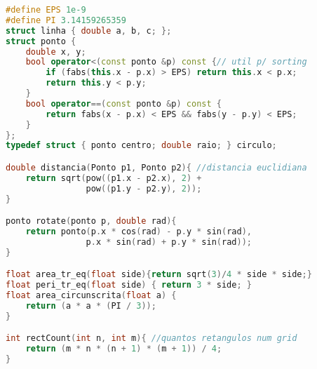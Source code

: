 \begin{lstlisting}[language=C++]
#define EPS 1e-9
#define PI 3.14159265359
struct linha { double a, b, c; };
struct ponto {
	double x, y;
    bool operator<(const ponto &p) const {// util p/ sorting
    	if (fabs(this.x - p.x) > EPS) return this.x < p.x;
        return this.y < p.y;
    }
    bool operator==(const ponto &p) const {
    	return fabs(x - p.x) < EPS && fabs(y - p.y) < EPS;
    }
};
typedef struct { ponto centro; double raio; } circulo;

double distancia(Ponto p1, Ponto p2){ //distancia euclidiana
	return sqrt(pow((p1.x - p2.x), 2) + 
    			pow((p1.y - p2.y), 2));
}

ponto rotate(ponto p, double rad){
	return ponto(p.x * cos(rad) - p.y * sin(rad),
    			p.x * sin(rad) + p.y * sin(rad));
}

float area_tr_eq(float side){return sqrt(3)/4 * side * side;}
float peri_tr_eq(float side) { return 3 * side; }
float area_circunscrita(float a) {
    return (a * a * (PI / 3));
}

int rectCount(int n, int m){ //quantos retangulos num grid
    return (m * n * (n + 1) * (m + 1)) / 4;
}
\end{lstlisting}